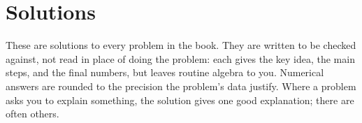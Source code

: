 \chapter{Solutions}
\label{app:solutions}

These are solutions to every problem in the book. They are written to be checked against, not read in place of doing the problem: each gives the key idea, the main steps, and the final numbers, but leaves routine algebra to you. Numerical answers are rounded to the precision the problem's data justify. Where a problem asks you to explain something, the solution gives one good explanation; there are often others.

